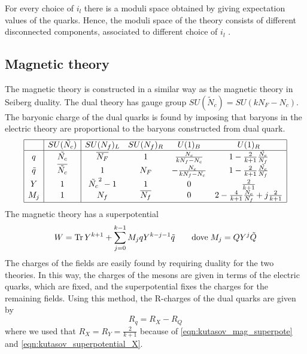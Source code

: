 For every choice of ${i_l}$ there is a moduli space obtained by giving expectation values of the quarks.
Hence, the moduli space of the theory consists of different disconnected components, associated to different choice of ${i_l}$ .



\subsection{Magnetic theory}
The magnetic theory is constructed in a similar way as the magnetic theory in Seiberg duality.
The dual theory has gauge group $SU(\tilde N_c) = SU(k N_F - N_c)$. 
The baryonic charge of the dual quarks is found by imposing that baryons in the electric theory are proportional to the baryons constructed from dual quark.
\begin{equation}
\begin{array}{|c |  c | c c c c |}
\hline
 & SU(\tilde{N_c})  & SU(N_f)_L  &SU(N_f)_R   & U(1)_B &  U(1)_R \\
\hline
q &  \tilde{N_c} & \overline{N_F}  & 1   &   \frac{N_c}{k N_f - N_c }  &  1 - \frac{2}{k+1} \frac{ \tilde{N_c}}{N_f}  \\
\tilde{q} & \overline{\tilde{N_c}}  & 1  &  N_F  & -\frac{N_c}{k N_f - N_c }   &   1 - \frac{2}{k+1} \frac{\tilde{N_c}}{N_f}   \\
Y & 1  &  \tilde{N_c}^2-1  & 1    & 0   &  \frac{2}{k+1} \\
 M_j & 1 & N_f &  \overline{N_f} & 0 & 2 - \frac{4}{k+1} \frac{N_c}{N_f} + j \frac{2}{k+1} \\
 \hline
\end{array}
\label{table:charge_table_mag_ks_4d}
\end{equation}
The magnetic theory has a superpotential
\begin{equation}
W = \mathrm{Tr } \, Y^{k+1} + \sum_{j=0}^{k-1} M_j q Y^{k-j-1} \tilde{q} \qquad \hbox{dove} \; M_j = Q Y^j \tilde{Q}
\label{eqn:kutasov_mag_superpote}
\end{equation}
The charges of the fields are easily found by requiring duality for the two theories.
In this way, the charges of the mesons are given in terms of the electric quarks, which are fixed, and the superpotential fixes the charges for the remaining fields.
Using this method, the R-charges of the dual quarks are given by
\begin{equation}
   R_q = R_X - R_Q 
 \label{eqn:R-charge_dual_quark}
\end{equation}
where we used that $R_X = R_Y = \frac{2}{k+1}$ because of \eqref{eqn:kutasov_mag_superpote} and \eqref{eqn:kutasov_superpotential_X}.















